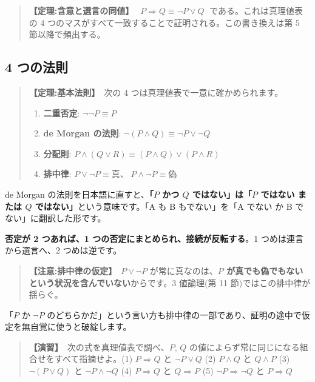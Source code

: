 \documentclass{article}
\begin{document}
\begin{quote}
\textbf{【定理:含意と選言の同値】}\ \(\;P \Rightarrow Q \equiv \neg P \lor Q\;\) である。これは真理値表の 4 つのマスがすべて一致することで証明される。この書き換えは第 5 節以降で頻出する。
\end{quote}

\subsection{4 つの法則}

\begin{quote}
\textbf{【定理:基本法則】}\ 次の 4 つは真理値表で一意に確かめられます。

\begin{enumerate}
\item \textbf{二重否定}: \(\neg \neg P \equiv P\)
\item \textbf{de Morgan の法則}: \(\neg (P \land Q) \equiv \neg P \lor \neg Q\)
\item \textbf{分配則}: \(P \land (Q \lor R) \equiv (P \land Q) \lor (P \land R)\)
\item \textbf{排中律}: \(P \lor \neg P \equiv \text{真}\)、\(\;P \land \neg P \equiv \text{偽}\)
\end{enumerate}
\end{quote}

de Morgan の法則を日本語に直すと、\textbf{「\(P\) かつ \(Q\) ではない」は「\(P\) ではない または \(Q\) ではない」}という意味です。「A も B もでない」を「A でない か B でない」に翻訳した形です。

\textbf{否定が 2 つあれば、1 つの否定にまとめられ、接続が反転する}。1 つめは連言から選言へ、2 つめは逆です。

\begin{quote}
\textbf{【注意:排中律の仮定】}\ \(P \lor \neg P\) が常に真なのは、\textbf{\(P\) が真でも偽でもないという状況を含んでいない}からです。3 値論理(第 11 節)ではこの排中律が揺らぐ。
\end{quote}

「\(P\) か \(\neg P\) のどちらかだ」という言い方も排中律の一部であり、証明の途中で仮定を無自覚に使うと破綻します。

\begin{quote}
\textbf{【演習】}\ 次の式を真理値表で調べ、\(P\), \(Q\) の値によらず常に同じになる組合せをすべて指摘せよ。(1) \(P \Rightarrow Q\) と \(\neg P \lor Q\) (2) \(P \land Q\) と \(Q \land P\) (3) \(\neg (P \lor Q)\) と \(\neg P \land \neg Q\) (4) \(P \Rightarrow Q\) と \(Q \Rightarrow P\) (5) \(\neg P \Rightarrow \neg Q\) と \(P \Rightarrow Q\)
\end{quote}
\end{document}
